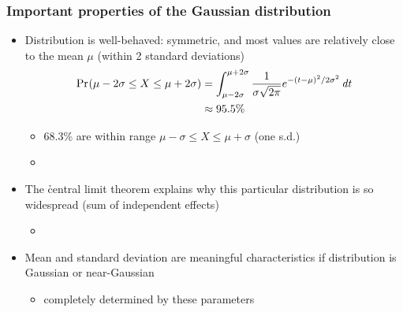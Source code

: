 \documentclass[t]{beamer} %
\begin{document}
\begin{frame}
  \frametitle{Important properties of the Gaussian distribution}

  \begin{itemize}
  \item<1-> Distribution is well-behaved: symmetric, and most values are
    relatively close to the mean $\mu$ (within 2 standard deviations)
    \begin{align*}
      \mathop{\mathrm{Pr}_{}}(\mu-2\sigma\leq X\leq \mu+2\sigma) 
      &= \int_{\mu-2\sigma}^{\mu+2\sigma }
      \frac{1}{\sigma \sqrt{2\pi}} e^{-(t-\mu)^2 / 2\sigma^2} \,\mathit{d{t}}\\
      &\approx 95.5\%
    \end{align*}
    \ungap[1.5]
    \begin{itemize}
    \item 68.3\% are within range $\mu-\sigma\leq X\leq \mu+\sigma$
      (one s.d.)
    \item[]
    \end{itemize}
  \item<2-> The \h{central limit theorem} explains why this particular
    distribution is so widespread (sum of independent effects)
    \begin{itemize}
    \item[]
    \end{itemize}
  \item<3->[\hand] Mean and standard deviation are meaningful characteristics
    if distribution is Gaussian or near-Gaussian
    \begin{itemize}
    \item completely determined by these parameters
    \end{itemize}
  \end{itemize}
\end{frame}


\end{document}
